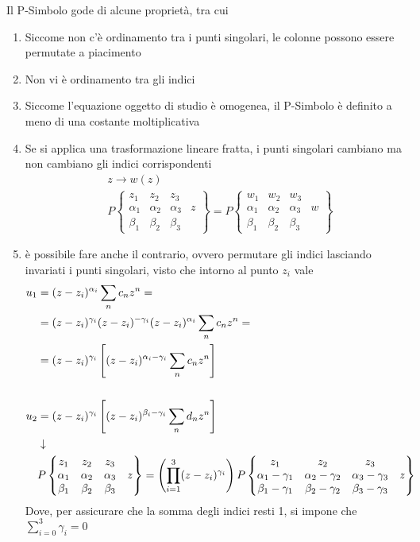 Il P-Simbolo gode di alcune proprietà, tra cui
\begin{enumerate}
	\item Siccome non c'è ordinamento tra i punti singolari, le colonne possono essere permutate a piacimento
	\item Non vi è ordinamento tra gli indici
	\item Siccome l'equazione oggetto di studio è omogenea, il P-Simbolo è definito a meno di una costante moltiplicativa
	\item Se si applica una trasformazione lineare fratta, i punti singolari cambiano ma non cambiano gli indici corrispondenti
	\begin{align}
		&z \to w(z)\\
		&P\left\{\begin{matrix}
			z_1 & z_2 & z_3 & \\
			\alpha_1 & \alpha_2 & \alpha_3& z\\
			\beta_1 & \beta_2 & \beta_3 & 
		\end{matrix}\right\} =
		P\left\{\begin{matrix}
			w_1 & w_2 & w_3 & \\
			\alpha_1 & \alpha_2 & \alpha_3& w\\
			\beta_1 & \beta_2 & \beta_3 & 
		\end{matrix}\right\}
	\end{align}
	\item è possibile fare anche il contrario, ovvero permutare gli indici lasciando invariati i punti singolari, visto che intorno al punto $z_i$ vale
	\begin{align}
		u_1 &= (z-z_i)^{\alpha_i}\sum_{n}c_nz^n =\nonumber\\
			&=(z-z_i)^{\gamma_i}(z-z_i)^{-\gamma_i}(z-z_i)^{\alpha_i}\sum_{n}c_nz^n =\nonumber\\
			&=(z-z_i)^{\gamma_i}\left[(z-z_i)^{\alpha_i-\gamma_i}\sum_{n}c_nz^n\right]\\
			\nonumber\\
		u_2 &= (z-z_i)^{\gamma_i}\left[(z-z_i)^{\beta_i-\gamma_i}\sum_{n}d_nz^n\right] \\ &\downarrow \nonumber \\
		&P\left\{\begin{matrix}
			z_1 & z_2 & z_3 & \\
			\alpha_1 & \alpha_2 & \alpha_3& z\\
			\beta_1 & \beta_2 & \beta_3 & 
		\end{matrix}\right\} = \left(\prod_{i=1}^3 (z-z_i)^{\gamma_i} \right)P\left\{\begin{matrix}
		z_1 & z_2 & z_3 & \\
		\alpha_1 - \gamma_1 & \alpha_2 - \gamma_2 & \alpha_3 - \gamma_3& z\\
		\beta_1 - \gamma_1 & \beta_2 - \gamma_2 & \beta_3  - \gamma_3& 
	\end{matrix}\right\}	
	\end{align}
	Dove, per assicurare che la somma degli indici resti 1, si impone che $\sum_{i=0}^3 \gamma_i = 0$	
\end{enumerate}

